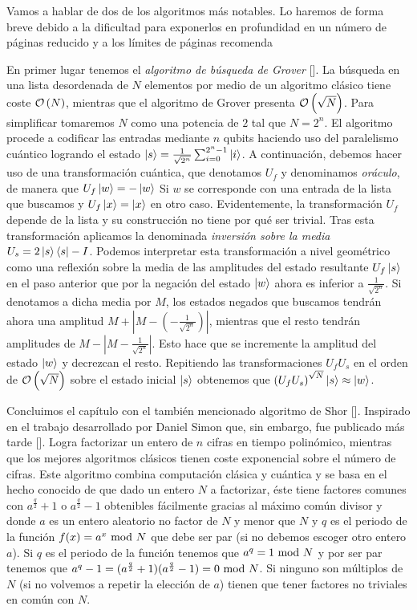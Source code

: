 Vamos a hablar de dos de los algoritmos más notables. Lo haremos de forma breve debido a la dificultad para exponerlos en profundidad en un número de páginas reducido y a los límites de páginas recomenda

En primer lugar tenemos el \textit{algoritmo de búsqueda de Grover} [\cite{grover1996fast}]. La búsqueda en una lista desordenada de $N$ elementos por medio de un algoritmo clásico tiene coste $\mathcal{O}\left(N\right)$, mientras que el algoritmo de Grover presenta $\mathcal{O}\left(\sqrt{N}\right)$. Para simplificar tomaremos $N$ como una potencia de $2$ tal que $N=2^n$. El algoritmo procede a codificar las entradas mediante $n$ qubits haciendo uso del paralelismo cuántico logrando el estado $\left|s\right\rangle=\frac{1}{\sqrt{2^n}}\sum_{i=0}^{2^n-1}\left|i\right\rangle$. A continuación, debemos hacer uso de una transformación cuántica, que denotamos $U_f$ y denominamos \textit{oráculo}, de manera que $U_f\left|w\right\rangle=-\left|w\right\rangle$ Si $w$ se corresponde con una entrada de la lista que buscamos y $U_f\left|x\right\rangle=\left|x\right\rangle$ en otro caso. Evidentemente, la transformación $U_f$ depende de la lista y su construcción no tiene por qué ser trivial. Tras esta transformación aplicamos la denominada \textit{inversión sobre la media} $U_s=2\left|s\right\rangle\left\langle s\right|-I$. Podemos interpretar esta transformación a nivel geométrico como una reflexión sobre la media de las amplitudes del estado resultante $U_f\left|s\right\rangle$ en el paso anterior que por la negación del estado $\left|w\right\rangle$ ahora es inferior a $\frac{1}{\sqrt{2^n}}$. Si denotamos a dicha media por $M$, los estados negados que buscamos tendrán ahora una amplitud $M + |M -(-\frac{1}{\sqrt{2^n}})|$, mientras que el resto tendrán amplitudes de $M - |M -\frac{1}{\sqrt{2^n}}|$. Esto hace que se incremente la amplitud del estado $\left|w\right\rangle$ y decrezcan el resto. Repitiendo las transformaciones $U_fU_s$ en el orden de $\mathcal{O}\left(\sqrt{N}\right)$ sobre el estado inicial $\left|s\right\rangle$ obtenemos que $\left(U_fU_s\right)^{\sqrt{N}}\left|s\right\rangle\approx\left|w\right\rangle$.

Concluimos el capítulo con el también mencionado algoritmo de Shor [\cite{shor1994algorithms}]. Inspirado en el trabajo desarrollado por Daniel Simon que, sin embargo, fue publicado más tarde [\cite{simon1997power}]. Logra factorizar un entero de $n$ cifras en tiempo polinómico, mientras que los mejores algoritmos clásicos tienen coste exponencial sobre el número de cifras. Este algoritmo combina computación clásica y cuántica y se basa en el hecho conocido de que dado un entero $N$ a factorizar, éste tiene factores comunes con $a^{\frac{q}{2}}+1$ o $a^{\frac{q}{2}}-1$ obtenibles fácilmente gracias al máximo común divisor y donde $a$ es un entero aleatorio no factor de $N$ y menor que $N$ y $q$ es el periodo de la función $f(x)=a^x\textrm{ mod } N$ que debe ser par (si no debemos escoger otro entero $a$). Si $q$ es el periodo de la función tenemos que $a^q=1\textrm{ mod } N$ y por ser par tenemos que $a^q-1=(a^\frac{q}{2}+1)(a^\frac{q}{2}-1)=0\textrm{ mod } N$. Si ninguno son múltiplos de $N$ (si no volvemos a repetir la elección de $a$) tienen que tener factores no triviales en común con $N$.

